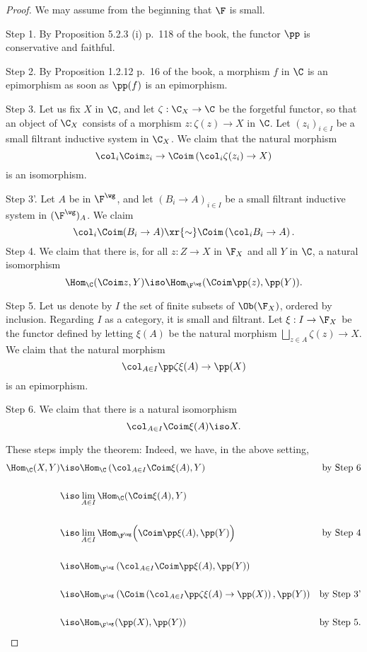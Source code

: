\documentclass[12pt]{article}
\theoremstyle{remark}
\theoremstyle{definition}
\begin{document}
\begin{proof} We may assume from the beginning that $\F$ is small.

\nn Step 1. By Proposition 5.2.3 (i) p.~118 of the book, the functor $\pp$ is conservative and faithful.

\nn Step 2. By Proposition 1.2.12 p.~16 of the book, a morphism $f$ in $\C$ is an epimorphism as soon as $\pp(f)$ is an epimorphism.

\nn Step 3. Let us fix $X$ in $\C$, and let $\zeta:\C_X\to\C$ be the forgetful functor, so that an object of $\C_X$ consists of a morphism $z:\zeta(z)\to X$ in $\C$. Let $(z_i)_{i\in I}$ be a small filtrant inductive system in $\C_X$. We claim that the natural morphism
$$
\col_i\Coim z_i\to\Coim\left(\col_i\zeta(z_i)\to X\right)
$$
is an isomorphism.

\nn Step 3'. Let $A$ be in $\F^\wg$, and let $(B_i\to A)_{i\in I}$ be a small filtrant inductive system in $(\F^\wg)_A$. We claim 
$$
\col_i\Coim(B_i\to A)\xr{\sim}
\Coim\left(\col_iB_i\to A\right).
$$
Step 4. We claim that there is, for all $z:Z\to X$ in $\F_X$ and all $Y$ in $\C$, a natural isomorphism 
$$
\Hom_\C(\Coim z,Y)\iso\Hom_{\F^\wg}(\Coim\pp(z),\pp(Y)).
$$ 

\nn Step 5. Let us denote by $I$ the set of finite subsets of $\Ob(\F_X)$, ordered by inclusion. Regarding $I$ as a category, it is small and filtrant. Let $\xi:I\to\F_X$ be the functor defined by letting $\xi(A)$ be the natural morphism $\bigsqcup_{z\in A}\zeta(z)\to X$. We claim that the natural morphism 
$$
\col_{A\in I}\pp\zeta\xi(A)\to\pp(X) 
$$ 
is an epimorphism.

\nn Step 6. We claim that there is a natural isomorphism 
$$
\col_{A\in I}\Coim\xi(A)\iso X. 
$$

These steps imply the theorem: Indeed, we have, in the above setting, 
%
\begin{align*} 
%
\Hom_\C(X,Y)&\iso\Hom_\C\left(\col_{A\in I}\Coim\xi(A),Y\right)&\text{by Step 6}\\ \\ 
%
&\iso\lim_{A\in I}\Hom_\C(\Coim\xi(A),Y)\\ \\ 
%
&\iso\lim_{A\in I}\Hom_{\F^\wg}\Big(\Coim\pp\xi(A),\pp(Y)\Big)&\text{by Step 4}\\ \\ 
%
&\iso\Hom_{\F^\wg}\left(\col_{A\in I}\Coim\pp\xi(A),\pp(Y)\right)\\ \\ 
%
&\iso\Hom_{\F^\wg}\left(\Coim\left(\col_{A\in I}\pp\zeta\xi(A)\to\pp(X)\right),\pp(Y)\right)&\text{by Step 3'}\\ \\ 
%
&\iso\Hom_{\F^\wg}(\pp(X),\pp(Y))&\text{by Step 5.}
%
\end{align*} 


\end{proof}
\end{document}
